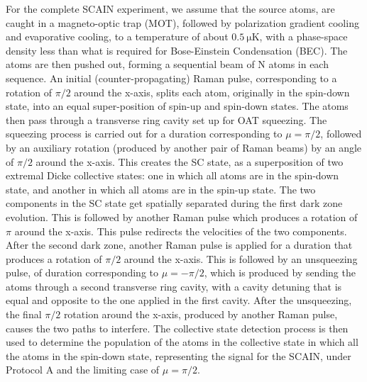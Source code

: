 \documentclass[aps,pra,letterpaper,superscriptaddress,showpacs,amsmath,floats,twocolumn]{revtex4-1}
\begin{document}
For the complete SCAIN experiment, we assume that the source atoms, are caught in a magneto-optic trap (MOT), followed by polarization gradient cooling and evaporative cooling, to a temperature of about $\SI{0.5}{\micro\kelvin}$, with a phase-space density less than what is required for Bose-Einstein Condensation (BEC). The atoms are then pushed out, forming a sequential beam of N atoms in each sequence. An initial (counter-propagating) Raman pulse, corresponding to a rotation of $\pi/2$ around the x-axis, splits each atom, originally in the spin-down state, into an equal super-position of spin-up and spin-down states. The atoms then pass through a transverse ring cavity set up for OAT squeezing. The squeezing process is carried out for a duration corresponding to $\mu=\pi/2$, followed by an auxiliary rotation (produced by another pair of Raman beams) by an angle of $\pi/2$ around the x-axis. This creates the SC state, as a superposition of two extremal Dicke collective states: one in which all atoms are in the spin-down state, and another in which all atoms are in the spin-up state. The two components in the SC state get spatially separated during the first dark zone evolution. This is followed by another Raman pulse which produces a rotation of $\pi$ around the x-axis. This pulse redirects the velocities of the two components. After the second dark zone, another Raman pulse is applied for a duration that produces a rotation of $\pi/2$ around the x-axis. This is followed by an unsqueezing pulse, of duration corresponding to $\mu=-\pi/2$, which is produced by sending the atoms through a second transverse ring cavity, with a cavity detuning that is equal and opposite to the one applied in the first cavity. After the unsqueezing, the final $\pi/2$ rotation around the x-axis, produced by another Raman pulse, causes the two paths to interfere. The collective state detection process is then used to determine the population of the atoms in the collective state in which all the atoms in the spin-down state, representing the signal for the SCAIN, under Protocol A and the limiting case of $\mu=\pi/2$.  
\end{document}
